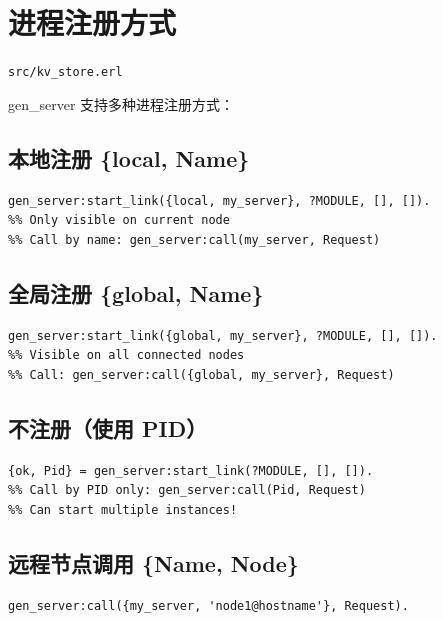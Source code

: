 \documentclass[a4paper,11pt]{article}
\begin{document}
\section{进程注册方式}

\begin{notebox}[源码文件]
\texttt{src/kv\_store.erl}
\end{notebox}

gen\_server 支持多种进程注册方式：

\subsection{本地注册 \{local, Name\}}

\begin{lstlisting}[style=erlangstyle]
gen_server:start_link({local, my_server}, ?MODULE, [], []).
%% Only visible on current node
%% Call by name: gen_server:call(my_server, Request)
\end{lstlisting}

\subsection{全局注册 \{global, Name\}}

\begin{lstlisting}[style=erlangstyle]
gen_server:start_link({global, my_server}, ?MODULE, [], []).
%% Visible on all connected nodes
%% Call: gen_server:call({global, my_server}, Request)
\end{lstlisting}

\subsection{不注册（使用 PID）}

\begin{lstlisting}[style=erlangstyle]
{ok, Pid} = gen_server:start_link(?MODULE, [], []).
%% Call by PID only: gen_server:call(Pid, Request)
%% Can start multiple instances!
\end{lstlisting}

\subsection{远程节点调用 \{Name, Node\}}

\begin{lstlisting}[style=erlangstyle]
%% Call a locally registered process on a remote node
gen_server:call({my_server, 'node1@hostname'}, Request).
\end{lstlisting}
\end{document}
